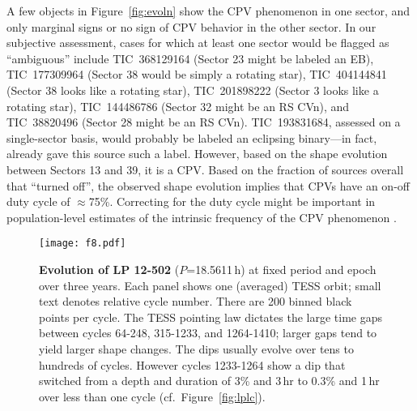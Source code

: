 \documentclass[11pt,twocolumn,tighten]{aastex63}
\begin{document}
A few objects in Figure~\ref{fig:evoln} show the CPV phenomenon in one
sector, and only marginal signs or no sign of CPV behavior in the other
sector.  In our subjective assessment, cases for which at least one
sector would be flagged as ``ambiguous'' include
TIC~368129164 (Sector 23 might be labeled an EB),
TIC~177309964 (Sector 38 would be simply a rotating star),
TIC~404144841 (Sector 38 looks like a rotating star),
TIC~201898222 (Sector 3 looks like a rotating star),
TIC~144486786 (Sector 32 might be an RS CVn),
and
TIC~38820496 (Sector 28 might be an RS CVn).
TIC~193831684, assessed on a single-sector basis, would probably be
labeled an eclipsing binary---in fact, \citet{2021ApJ...912..123J}
already gave this source such a label.  However, based on the shape
evolution between Sectors 13 and 39, it is a CPV.  Based on the
fraction of sources overall that ``turned off'', the observed shape
evolution implies that CPVs have an on-off duty cycle of $\approx$75\%.
Correcting for the duty cycle might be important in population-level
estimates of the intrinsic frequency of the CPV phenomenon
\citep[e.g.][]{2022AJ....163..144G}.



\begin{figure*}[!t]
	\begin{center}
		\centering
		\texttt{[image: f8.pdf]}
		\vspace{-0.3cm}
		\caption{
			{\bf Evolution of LP 12-502} ($P$=18.5611\,h) at fixed period and
      epoch over three years.  Each panel shows one (averaged) TESS
			orbit; small text denotes relative cycle number.  There are 200
			binned black points per cycle.  The TESS pointing law dictates
			the large time gaps between cycles 64-248, 315-1233, and
			1264-1410; larger gaps tend to yield larger shape changes.  The
			dips usually evolve over tens to hundreds of cycles.  However
			cycles 1233-1264 show a dip that switched from a depth and
			duration of 3\% and 3\,hr to 0.3\% and 1\,hr over less than one
			cycle (cf.~Figure~\ref{fig:lplc}).
		}
		\label{fig:lp}
	\end{center}
\end{figure*}

\end{document}
